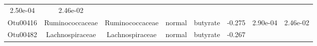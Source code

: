 \documentclass[11pt,]{article}
\begin{document}
\begin{longtable}[]{@{}cccccccc@{}}
\begin{minipage}[t]{0.08\columnwidth}
2.50e-04\strut
\end{minipage} & \begin{minipage}[t]{0.08\columnwidth}\centering\strut
2.46e-02\strut
\end{minipage}\tabularnewline
\begin{minipage}[t]{0.08\columnwidth}\centering\strut
Otu00416\strut
\end{minipage} & \begin{minipage}[t]{0.15\columnwidth}\centering\strut
Ruminococcaceae\strut
\end{minipage} & \begin{minipage}[t]{0.15\columnwidth}\centering\strut
Ruminococcaceae\strut
\end{minipage} & \begin{minipage}[t]{0.08\columnwidth}\centering\strut
normal\strut
\end{minipage} & \begin{minipage}[t]{0.09\columnwidth}\centering\strut
butyrate\strut
\end{minipage} & \begin{minipage}[t]{0.07\columnwidth}\centering\strut
-0.275\strut
\end{minipage} & \begin{minipage}[t]{0.08\columnwidth}\centering\strut
2.90e-04\strut
\end{minipage} & \begin{minipage}[t]{0.08\columnwidth}\centering\strut
2.46e-02\strut
\end{minipage}\tabularnewline
\begin{minipage}[t]{0.08\columnwidth}\centering\strut
Otu00482\strut
\end{minipage} & \begin{minipage}[t]{0.15\columnwidth}\centering\strut
Lachnospiraceae\strut
\end{minipage} & \begin{minipage}[t]{0.15\columnwidth}\centering\strut
Lachnospiraceae\strut
\end{minipage} & \begin{minipage}[t]{0.08\columnwidth}\centering\strut
normal\strut
\end{minipage} & \begin{minipage}[t]{0.09\columnwidth}\centering\strut
butyrate\strut
\end{minipage} & \begin{minipage}[t]{0.07\columnwidth}\centering\strut
-0.267\strut
\end{minipage} & \begin{minipage}[t]{0.08\columnwidth}\centering\strut

\end{minipage}
\end{longtable}
\end{document}
